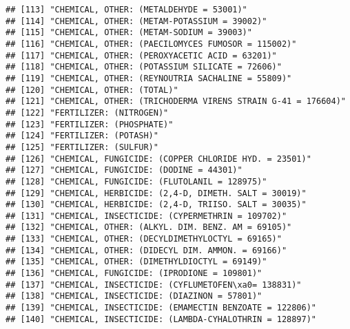 \documentclass[
]{article}
\begin{document}
\begin{verbatim}
## [113] "CHEMICAL, OTHER: (METALDEHYDE = 53001)"                                            
## [114] "CHEMICAL, OTHER: (METAM-POTASSIUM = 39002)"                                        
## [115] "CHEMICAL, OTHER: (METAM-SODIUM = 39003)"                                           
## [116] "CHEMICAL, OTHER: (PAECILOMYCES FUMOSOR = 115002)"                                  
## [117] "CHEMICAL, OTHER: (PEROXYACETIC ACID = 63201)"                                      
## [118] "CHEMICAL, OTHER: (POTASSIUM SILICATE = 72606)"                                     
## [119] "CHEMICAL, OTHER: (REYNOUTRIA SACHALINE = 55809)"                                   
## [120] "CHEMICAL, OTHER: (TOTAL)"                                                          
## [121] "CHEMICAL, OTHER: (TRICHODERMA VIRENS STRAIN G-41 = 176604)"                        
## [122] "FERTILIZER: (NITROGEN)"                                                            
## [123] "FERTILIZER: (PHOSPHATE)"                                                           
## [124] "FERTILIZER: (POTASH)"                                                              
## [125] "FERTILIZER: (SULFUR)"                                                              
## [126] "CHEMICAL, FUNGICIDE: (COPPER CHLORIDE HYD. = 23501)"                               
## [127] "CHEMICAL, FUNGICIDE: (DODINE = 44301)"                                             
## [128] "CHEMICAL, FUNGICIDE: (FLUTOLANIL = 128975)"                                        
## [129] "CHEMICAL, HERBICIDE: (2,4-D, DIMETH. SALT = 30019)"                                
## [130] "CHEMICAL, HERBICIDE: (2,4-D, TRIISO. SALT = 30035)"                                
## [131] "CHEMICAL, INSECTICIDE: (CYPERMETHRIN = 109702)"                                    
## [132] "CHEMICAL, OTHER: (ALKYL. DIM. BENZ. AM = 69105)"                                   
## [133] "CHEMICAL, OTHER: (DECYLDIMETHYLOCTYL = 69165)"                                     
## [134] "CHEMICAL, OTHER: (DIDECYL DIM. AMMON. = 69166)"                                    
## [135] "CHEMICAL, OTHER: (DIMETHYLDIOCTYL = 69149)"                                        
## [136] "CHEMICAL, FUNGICIDE: (IPRODIONE = 109801)"                                         
## [137] "CHEMICAL, INSECTICIDE: (CYFLUMETOFEN\xa0= 138831)"                                    
## [138] "CHEMICAL, INSECTICIDE: (DIAZINON = 57801)"                                         
## [139] "CHEMICAL, INSECTICIDE: (EMAMECTIN BENZOATE = 122806)"                              
## [140] "CHEMICAL, INSECTICIDE: (LAMBDA-CYHALOTHRIN = 128897)"                              

\end{verbatim}
\end{document}
